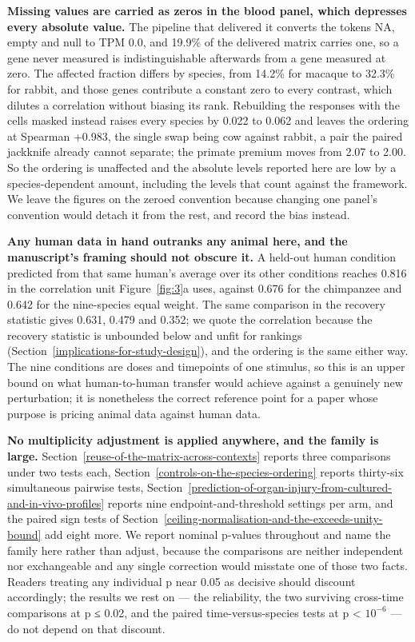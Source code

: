 \documentclass[11pt,a4paper]{article}
\begin{document}
\textbf{Missing values are carried as zeros in the blood panel, which
depresses every absolute value.} The pipeline that delivered it converts
the tokens NA, empty and null to TPM 0.0, and 19.9\% of the delivered
matrix carries one, so a gene never measured is indistinguishable
afterwards from a gene measured at zero. The affected fraction differs
by species, from 14.2\% for macaque to 32.3\% for rabbit, and those
genes contribute a constant zero to every contrast, which dilutes a
correlation without biasing its rank. Rebuilding the responses with the
cells masked instead raises every species by 0.022 to 0.062 and leaves
the ordering at Spearman +0.983, the single swap being cow against
rabbit, a pair the paired jackknife already cannot separate; the primate
premium moves from 2.07 to 2.00. So the ordering is unaffected and the
absolute levels reported here are low by a species-dependent amount,
including the levels that count against the framework. We leave the
figures on the zeroed convention because changing one panel's convention
would detach it from the rest, and record the bias instead.

\textbf{Any human data in hand outranks any animal here, and the
manuscript's framing should not obscure it.} A held-out human condition
predicted from that same human's average over its other conditions
reaches 0.816 in the correlation unit Figure~\ref{fig:3}a uses, against 0.676 for
the chimpanzee and 0.642 for the nine-species equal weight. The same
comparison in the recovery statistic gives 0.631, 0.479 and 0.352; we
quote the correlation because the recovery statistic is unbounded below
and unfit for rankings (Section~\ref{implications-for-study-design}), and the ordering is the same
either way. The nine conditions are doses and timepoints of one
stimulus, so this is an upper bound on what human-to-human transfer
would achieve against a genuinely new perturbation; it is nonetheless
the correct reference point for a paper whose purpose is pricing animal
data against human data.

\textbf{No multiplicity adjustment is applied anywhere, and the family
is large.} Section~\ref{reuse-of-the-matrix-across-contexts} reports three comparisons under two tests each,
Section~\ref{controls-on-the-species-ordering} reports thirty-six simultaneous pairwise tests, Section~\ref{prediction-of-organ-injury-from-cultured-and-in-vivo-profiles}
reports nine endpoint-and-threshold settings per arm, and the paired
sign tests of Section~\ref{ceiling-normalisation-and-the-exceeds-unity-bound} add eight more. We report nominal p-values
throughout and name the family here rather than adjust, because the
comparisons are neither independent nor exchangeable and any single
correction would misstate one of those two facts. Readers treating any
individual p near 0.05 as decisive should discount accordingly; the
results we rest on --- the reliability, the two surviving cross-time
comparisons at p ≤ 0.02, and the paired time-versus-species tests at p
\textless{} \ensuremath{10^{-6}} --- do not depend on that discount.
\end{document}

